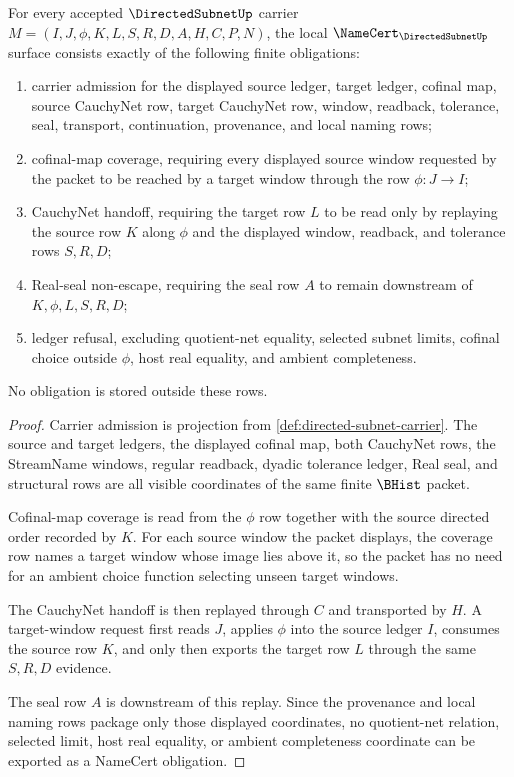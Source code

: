 \begin{theorem}
\label{thm:directed-subnet-namecert-obligations}
For every accepted $\DirectedSubnetUp$ carrier $M=(I,J,\phi,K,L,S,R,D,A,H,C,P,N)$, the local $\NameCert_{\DirectedSubnetUp}$ surface consists exactly of the following finite obligations:
\begin{enumerate}
\item carrier admission for the displayed source ledger, target ledger, cofinal map, source CauchyNet row, target CauchyNet row, window, readback, tolerance, seal, transport, continuation, provenance, and local naming rows;
\item cofinal-map coverage, requiring every displayed source window requested by the packet to be reached by a target window through the row $\phi:J\to I$;
\item CauchyNet handoff, requiring the target row $L$ to be read only by replaying the source row $K$ along $\phi$ and the displayed window, readback, and tolerance rows $S,R,D$;
\item Real-seal non-escape, requiring the seal row $A$ to remain downstream of $K,\phi,L,S,R,D$;
\item ledger refusal, excluding quotient-net equality, selected subnet limits, cofinal choice outside $\phi$, host real equality, and ambient completeness.
\end{enumerate}
No obligation is stored outside these rows.
\end{theorem}
\begin{proof}
Carrier admission is projection from \autoref{def:directed-subnet-carrier}. The source and target ledgers, the displayed cofinal map, both CauchyNet rows, the StreamName windows, regular readback, dyadic tolerance ledger, Real seal, and structural rows are all visible coordinates of the same finite $\BHist$ packet.

Cofinal-map coverage is read from the $\phi$ row together with the source directed order recorded by $K$. For each source window the packet displays, the coverage row names a target window whose image lies above it, so the packet has no need for an ambient choice function selecting unseen target windows.

The CauchyNet handoff is then replayed through $C$ and transported by $H$. A target-window request first reads $J$, applies $\phi$ into the source ledger $I$, consumes the source row $K$, and only then exports the target row $L$ through the same $S,R,D$ evidence.

The seal row $A$ is downstream of this replay. Since the provenance and local naming rows package only those displayed coordinates, no quotient-net relation, selected limit, host real equality, or ambient completeness coordinate can be exported as a NameCert obligation.
\end{proof}

